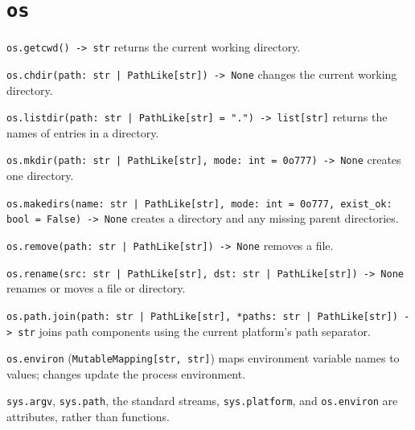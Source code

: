 \documentclass[11pt]{article}
\begin{document}
\section{\texttt{os}}

\texttt{os.getcwd() -> str} returns the current working directory.

\texttt{os.chdir(path: str | PathLike[str]) -> None} changes the current working directory.

\texttt{os.listdir(path: str | PathLike[str] = ".") -> list[str]} returns the names of entries in a directory.

\texttt{os.mkdir(path: str | PathLike[str], mode: int = 0o777) -> None} creates one directory.

\texttt{os.makedirs(name: str | PathLike[str], mode: int = 0o777, exist\_ok: bool = False) -> None} creates a directory and any missing parent directories.

\texttt{os.remove(path: str | PathLike[str]) -> None} removes a file.

\texttt{os.rename(src: str | PathLike[str], dst: str | PathLike[str]) -> None} renames or moves a file or directory.

\texttt{os.path.join(path: str | PathLike[str], *paths: str | PathLike[str]) -> str} joins path components using the current platform's path separator.

\texttt{os.environ} (\texttt{MutableMapping[str, str]}) maps environment variable names to values; changes update the process environment.

\texttt{sys.argv}, \texttt{sys.path}, the standard streams, \texttt{sys.platform}, and \texttt{os.environ} are attributes, rather than functions.
\end{document}
